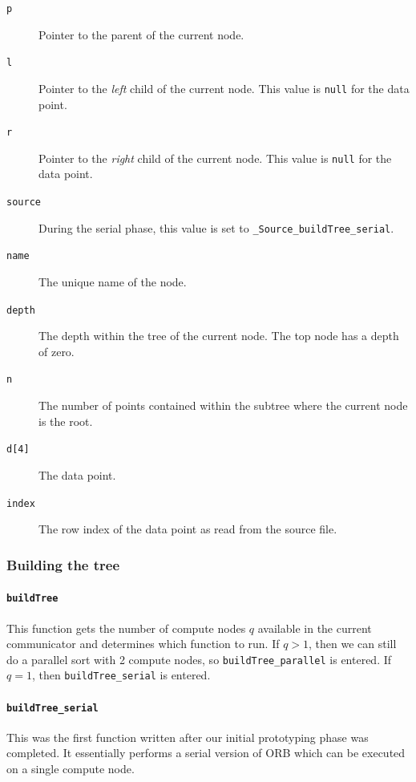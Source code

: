 \documentclass{article}
\begin{document}
\begin{description}
    \item[\texttt{p}]{Pointer to the parent of the current node.}
    \item[\texttt{l}]{Pointer to the \textit{left} child of the current node. This value is \texttt{null} for the data point.}
    \item[\texttt{r}]{Pointer to the \textit{right} child of the current node. This value is \texttt{null} for the data point.}
    \item[\texttt{source}]{During the serial phase, this value is set to \texttt{\_Source\_buildTree\_serial}.}
    \item[\texttt{name}]{The unique name of the node.}
    \item[\texttt{depth}]{The depth within the tree of the current node. The top node has a depth of zero.}
    \item[\texttt{n}]{The number of points contained within the subtree where the current node is the root.}
    \item[\texttt{d[4]}]{The data point.}
    \item[\texttt{index}]{The row index of the data point as read from the source file.}
\end{description}


%
%

\subsubsection{Building the tree}

\paragraph{\texttt{buildTree}}
This function gets the number of compute nodes $q$ available in the current communicator and determines which function to run. If $q>1$, then we can still do a parallel sort with 2 compute nodes, so \texttt{buildTree\_parallel} is entered. If $q=1$, then \texttt{buildTree\_serial} is entered.


\paragraph{\texttt{buildTree\_serial}}
This was the first function written after our initial prototyping phase was completed. It essentially performs a serial version of ORB which can be executed on a single compute node.
\end{document}
